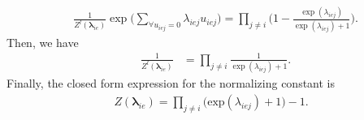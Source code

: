 \documentclass[ba]{imsart}
\numberwithin{equation}{section}
\theoremstyle{plain}
\begin{document}
		\begin{equation*}
			\begin{aligned}
				&\frac{1}{Z^{l}(\boldsymbol{\lambda}_{ie})}\exp\Big(\sum\limits_{\forall u_{iej}=0}\lambda_{iej}u_{iej} \Big)= \prod_{j \neq i}   \Big(1-\frac{ \exp{(\lambda_{iej})}}{\exp{(\lambda_{iej})} + 1}\Big).
			\end{aligned}  
		\end{equation*}
		Then, we have 
		\begin{equation*}
			\begin{aligned}
				& \frac{1}{Z^{l}(\boldsymbol{\lambda}_{ie})} &= \prod\limits_{j \neq i}\frac{1}{ \exp(\lambda_{iej})+ 1}.
			\end{aligned}  
		\end{equation*}
		Finally, the closed form expression for the normalizing constant is  
		\begin{equation*}
			\begin{aligned}Z(\boldsymbol{\lambda}_{ie}) = \prod_{j \neq i} \big(\mbox{exp}(\lambda_{iej}) + 1\big)-1.
			\end{aligned}  
		\end{equation*}
\end{document}
